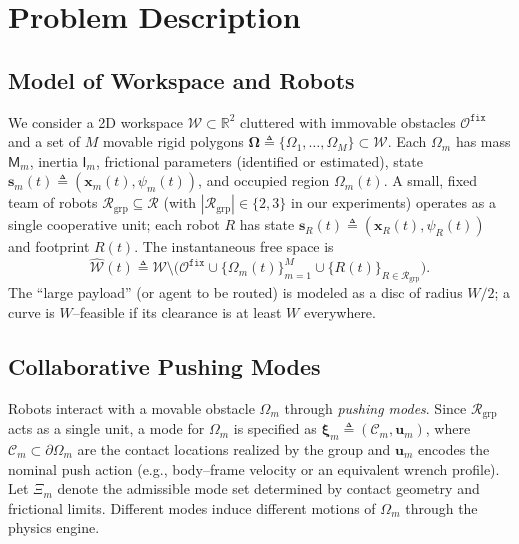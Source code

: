 \section{Problem Description}\label{sec:problem}

\subsection{Model of Workspace and Robots}\label{subsec:ws}
We consider a 2D workspace $\mathcal{W}\subset\mathbb{R}^2$ cluttered with
immovable obstacles $\mathcal{O}^{\texttt{fix}}$ and a set of $M$ movable rigid
polygons $\boldsymbol{\Omega}\triangleq\{\Omega_1,\ldots,\Omega_M\}\subset\mathcal{W}$.
Each $\Omega_m$ has mass $\mathsf{M}_m$, inertia $\mathsf{I}_m$, frictional
parameters (identified or estimated), state
$\mathbf{s}_m(t)\triangleq(\mathbf{x}_m(t),\psi_m(t))$, and occupied region
$\Omega_m(t)$.
A small, fixed team of robots $\mathcal{R}_{\mathrm{grp}}\subseteq\mathcal{R}$
(with $|\mathcal{R}_{\mathrm{grp}}|\in\{2,3\}$ in our experiments) operates as a
single cooperative unit; each robot $R$ has state
$\mathbf{s}_R(t)\triangleq(\mathbf{x}_R(t),\psi_R(t))$ and footprint $R(t)$.
The instantaneous free space is
\[
\widehat{\mathcal{W}}(t)\triangleq\mathcal{W}\setminus\Big(
\mathcal{O}^{\texttt{fix}}\cup\{\Omega_m(t)\}_{m=1}^{M}\cup\{R(t)\}_{R\in\mathcal{R}_{\mathrm{grp}}}
\Big).
\]
The “large payload” (or agent to be routed) is modeled as a disc of radius $W/2$;
a curve is $W$–feasible if its clearance is at least $W$ everywhere.

\subsection{Collaborative Pushing Modes}\label{ss:interaction_mode}
Robots interact with a movable obstacle $\Omega_m$ through \emph{pushing modes}.
Since $\mathcal{R}_{\mathrm{grp}}$ acts as a single unit, a mode for $\Omega_m$
is specified as
$\boldsymbol{\xi}_m\triangleq(\mathcal{C}_m,\mathbf{u}_m)$,
where $\mathcal{C}_m\subset\partial\Omega_m$ are the contact locations realized
by the group and $\mathbf{u}_m$ encodes the nominal push action
(e.g., body–frame velocity or an equivalent wrench profile).
Let $\Xi_m$ denote the admissible mode set determined by contact geometry and
frictional limits. Different modes induce different motions of $\Omega_m$
through the physics engine.

